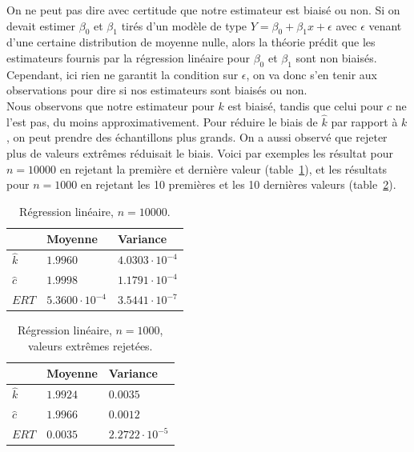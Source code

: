On ne peut pas dire avec certitude que notre estimateur est biaisé ou non. Si on devait estimer $\beta_0$ et $\beta_1$ tirés d'un modèle de type $Y = \beta_0 + \beta_1x + \epsilon$ avec $\epsilon$ venant d'une certaine distribution de moyenne nulle, alors la théorie prédit que les estimateurs fournis par la régression linéaire pour $\beta_0$ et $\beta_1$ sont non biaisés. Cependant, ici rien ne garantit la condition sur $\epsilon$, on va donc s'en tenir aux observations pour dire si nos estimateurs sont biaisés ou non.\\
Nous observons que notre estimateur pour $k$ est biaisé, tandis que celui pour $c$ ne l'est pas, du moins approximativement. Pour réduire le biais de $\hat{k}$ par rapport à $k$, on peut prendre des échantillons plus grands. On a aussi observé que rejeter plus de valeurs extrêmes réduisait le biais. Voici par exemples les résultat pour $n=10000$ en rejetant la première et dernière valeur (table~\ref{table:reg2}), et les résultats pour $n=1000$ en rejetant les 10 premières et les 10 dernières valeurs (table~\ref{table:reg10}).

\begin{table}[!ht]
\centering
\begin{tabular}{|l|l|l|}
\hline
				& Moyenne 	& Variance\\
\hline
$\hat{k}$ 	& $1.9960$ 	& $4.0303\cdot10^{-4}$\\
$\hat{c}$ 	& $1.9998$ 	& $1.1791\cdot10^{-4}$\\
$ERT$		& $5.3600\cdot10^{-4}$	& $3.5441\cdot 10^{-7}$\\
\hline
\end{tabular}
\caption{Régression linéaire, $n=10000$.}
\label{table:reg2}
\end{table}

\begin{table}[!ht]
\centering
\begin{tabular}{|l|l|l|}
\hline
				& Moyenne 	& Variance\\
\hline
$\hat{k}$ 	& $1.9924$ 	& $0.0035$\\
$\hat{c}$ 	& $1.9966$ 	& $0.0012$\\
$ERT$		& $0.0035$	& $2.2722\cdot 10^{-5}$\\
\hline
\end{tabular}
\caption{Régression linéaire, $n=1000$, valeurs extrêmes rejetées.}
\label{table:reg10}
\end{table}

